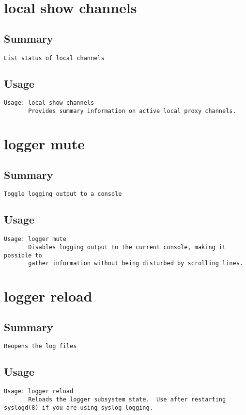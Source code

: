 \section{local show channels}
\subsection{Summary}
\begin{verbatim}
List status of local channels
\end{verbatim}
\subsection{Usage}
\begin{verbatim}
Usage: local show channels
       Provides summary information on active local proxy channels.

\end{verbatim}


\section{logger mute}
\subsection{Summary}
\begin{verbatim}
Toggle logging output to a console
\end{verbatim}
\subsection{Usage}
\begin{verbatim}
Usage: logger mute
       Disables logging output to the current console, making it possible to
       gather information without being disturbed by scrolling lines.

\end{verbatim}


\section{logger reload}
\subsection{Summary}
\begin{verbatim}
Reopens the log files
\end{verbatim}
\subsection{Usage}
\begin{verbatim}
Usage: logger reload
       Reloads the logger subsystem state.  Use after restarting syslogd(8) if you are using syslog logging.

\end{verbatim}


